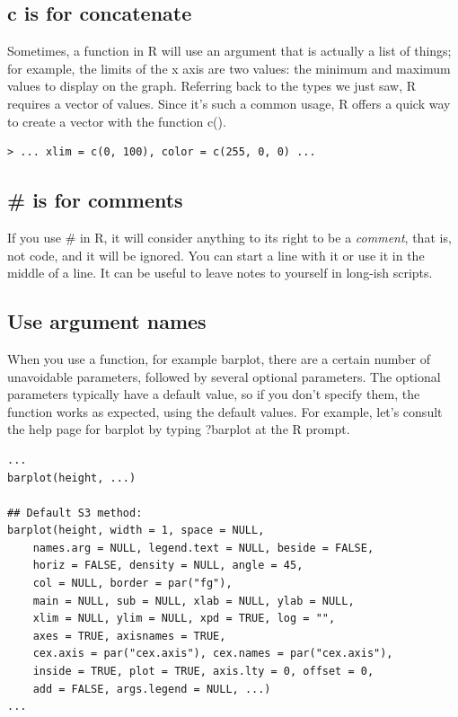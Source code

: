 \documentclass{report}
\newcommand{\code}[1]{\textsf{\ttfamily #1}}
\begin{document}
		\subsection{\code{c} is for concatenate}
		Sometimes, a function in R will use an argument that is actually a list of things; for example, the limits of the x axis are two values: the minimum and maximum values to display on the graph. Referring back to the types we just saw, R requires a \code{vector} of values. Since it's such a common usage, R offers a quick way to create a vector with the function \code{c()}.
		\begin{verbatim}
> ... xlim = c(0, 100), color = c(255, 0, 0) ...
		\end{verbatim}
	
		\subsection{\# is for comments}
		If you use \code{\#} in R, it will consider anything to its right to be a \emph{comment}, that is, not code, and it will be ignored. You can start a line with it or use it in the middle of a line. It can be useful to leave notes to yourself in long-ish scripts.
	
		\subsection{Use argument names}
		When you use a function, for example \code{barplot}, there are a certain number of unavoidable parameters, followed by several optional parameters. The optional parameters typically have a default value, so if you don't specify them, the function works as expected, using the default values. For example, let's consult the help page for \code{barplot} by typing \code{?barplot} at the R prompt.
		\begin{verbatim}
...
barplot(height, ...)

## Default S3 method:
barplot(height, width = 1, space = NULL,
	names.arg = NULL, legend.text = NULL, beside = FALSE,
	horiz = FALSE, density = NULL, angle = 45,
	col = NULL, border = par("fg"),
	main = NULL, sub = NULL, xlab = NULL, ylab = NULL,
	xlim = NULL, ylim = NULL, xpd = TRUE, log = "",
	axes = TRUE, axisnames = TRUE,
	cex.axis = par("cex.axis"), cex.names = par("cex.axis"),
	inside = TRUE, plot = TRUE, axis.lty = 0, offset = 0,
	add = FALSE, args.legend = NULL, ...)
...
		\end{verbatim}
	
\end{document}
